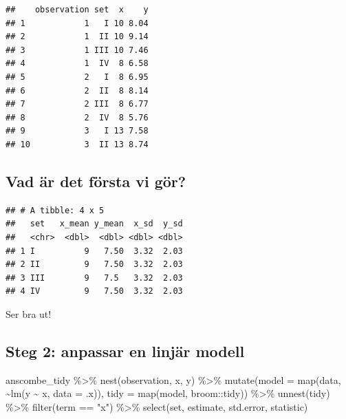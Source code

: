\documentclass[
]{book}
\newenvironment{Shaded}{\begin{snugshade}}{\end{snugshade}}
\newcommand{\AttributeTok}[1]{\textcolor[rgb]{0.77,0.63,0.00}{#1}}
\newcommand{\FunctionTok}[1]{\textcolor[rgb]{0.00,0.00,0.00}{#1}}
\newcommand{\NormalTok}[1]{#1}
\newcommand{\SpecialCharTok}[1]{\textcolor[rgb]{0.00,0.00,0.00}{#1}}
\newcommand{\StringTok}[1]{\textcolor[rgb]{0.31,0.60,0.02}{#1}}
\begin{document}
\begin{verbatim}
##    observation set  x    y
## 1            1   I 10 8.04
## 2            1  II 10 9.14
## 3            1 III 10 7.46
## 4            1  IV  8 6.58
## 5            2   I  8 6.95
## 6            2  II  8 8.14
## 7            2 III  8 6.77
## 8            2  IV  8 5.76
## 9            3   I 13 7.58
## 10           3  II 13 8.74
\end{verbatim}

\hypertarget{vad-uxe4r-det-fuxf6rsta-vi-guxf6r}{%
\subsection{Vad är det första vi gör?}\label{vad-uxe4r-det-fuxf6rsta-vi-guxf6r}}

\begin{verbatim}
## # A tibble: 4 x 5
##   set   x_mean y_mean  x_sd  y_sd
##   <chr>  <dbl>  <dbl> <dbl> <dbl>
## 1 I          9   7.50  3.32  2.03
## 2 II         9   7.50  3.32  2.03
## 3 III        9   7.5   3.32  2.03
## 4 IV         9   7.50  3.32  2.03
\end{verbatim}

Ser bra ut!

\hypertarget{steg-2-anpassar-en-linjuxe4r-modell}{%
\subsection{Steg 2: anpassar en linjär modell}\label{steg-2-anpassar-en-linjuxe4r-modell}}

\begin{Shaded}
\begin{Highlighting}[]
\NormalTok{anscombe\_tidy }\SpecialCharTok{\%\textgreater{}\%} 
  \FunctionTok{nest}\NormalTok{(observation, x, y) }\SpecialCharTok{\%\textgreater{}\%} 
  \FunctionTok{mutate}\NormalTok{(}\AttributeTok{model =} \FunctionTok{map}\NormalTok{(data, }\SpecialCharTok{\textasciitilde{}}\FunctionTok{lm}\NormalTok{(y }\SpecialCharTok{\textasciitilde{}}\NormalTok{ x, }\AttributeTok{data =}\NormalTok{ .x)),}
         \AttributeTok{tidy =} \FunctionTok{map}\NormalTok{(model, broom}\SpecialCharTok{::}\NormalTok{tidy)) }\SpecialCharTok{\%\textgreater{}\%} 
  \FunctionTok{unnest}\NormalTok{(tidy) }\SpecialCharTok{\%\textgreater{}\%} 
  \FunctionTok{filter}\NormalTok{(term }\SpecialCharTok{==} \StringTok{"x"}\NormalTok{) }\SpecialCharTok{\%\textgreater{}\%} 
  \FunctionTok{select}\NormalTok{(set, estimate, std.error, statistic)}
\end{Highlighting}
\end{Shaded}
\end{document}
